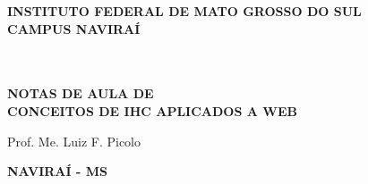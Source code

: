 \thispagestyle{empty}

\vfill
 \begin{center}
    
    {\large\bfseries INSTITUTO FEDERAL DE MATO GROSSO DO SUL} \\
    
    {\large\bfseries CAMPUS NAVIRAÍ}  \\ 

    \vspace*{1in}
    \begin{large} \end{large}\\[0.4in]

    \vspace*{4cm}
    \noindent \\
    
    \large\bfseries{NOTAS DE AULA DE} \\
    \huge\bfseries{CONCEITOS DE IHC APLICADOS A WEB} \\
    
    \vspace*{4cm}
    
    \large{Prof. Me. Luiz F. Picolo}
    
    \vfill
    \large\bfseries{ NAVIRAÍ - MS}
\end{center}

\normalsize


